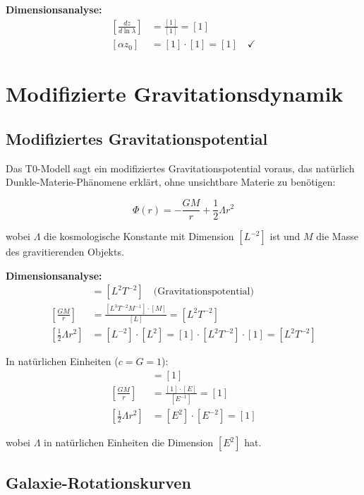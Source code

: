 \documentclass[12pt,a4paper]{report}
\begin{document}
	\textbf{Dimensionsanalyse:}
	\begin{align}
		\left[\frac{dz}{d\ln\lambda}\right] &= \frac{[1]}{[1]} = [1] \\
		[\alpha z_0] &= [1] \cdot [1] = [1] \quad \checkmark
	\end{align}
	
	\section{Modifizierte Gravitationsdynamik}
	\label{sec:modified_gravitational_dynamics}
	
\subsection{Modifiziertes Gravitationspotential}
\label{subsec:modified_potential}

Das T0-Modell sagt ein modifiziertes Gravitationspotential voraus, das natürlich Dunkle-Materie-Phänomene erklärt, ohne unsichtbare Materie zu benötigen:

\begin{equation}
	\Phi(r) = -\frac{GM}{r} + \frac{1}{2}\Lambda r^2
	\label{eq:modified_gravitational_potential}
\end{equation}

wobei $\Lambda$ die kosmologische Konstante mit Dimension $[L^{-2}]$ ist und $M$ die Masse des gravitierenden Objekts.

\textbf{Dimensionsanalyse:}
\begin{align}
	[\Phi(r)] &= [L^2 T^{-2}] \quad \text{(Gravitationspotential)} \\
	\left[\frac{GM}{r}\right] &= \frac{[L^3 T^{-2} M^{-1}] \cdot [M]}{[L]} = [L^2 T^{-2}] \\
	\left[\frac{1}{2}\Lambda r^2\right] &= [L^{-2}] \cdot [L^2] = [1] \cdot [L^2 T^{-2}] \cdot [1] = [L^2 T^{-2}]
\end{align}

In natürlichen Einheiten ($c = G = 1$):
\begin{align}
	[\Phi(r)] &= [1] \\
	\left[\frac{GM}{r}\right] &= \frac{[1] \cdot [E]}{[E^{-1}]} = [1] \\
	\left[\frac{1}{2}\Lambda r^2\right] &= [E^2] \cdot [E^{-2}] = [1]
\end{align}

wobei $\Lambda$ in natürlichen Einheiten die Dimension $[E^2]$ hat.	
\subsection{Galaxie-Rotationskurven}
\label{subsec:galaxy_rotation_curves}
\end{document}
